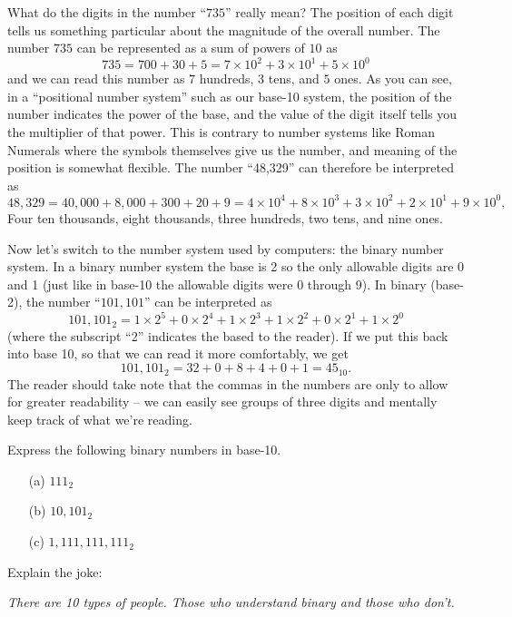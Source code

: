 What do the digits in the number ``$735$'' really mean?  The position of each digit tells
us something particular about the magnitude of the overall number.  The number $735$ can
be represented as a sum of powers of $10$ as
\[ 735 = 700 + 30 + 5 =  7 \times 10^2 + 3 \times 10^1 + 5 \times 10^0 \]
and we can read this number as $7$ hundreds, $3$ tens, and $5$ ones.
As you can see, in a ``positional number system'' such as our base-10 system, the
position of the number indicates the power of the base, and the value of the digit itself
tells you the multiplier of that power.  This is contrary to number systems like Roman
Numerals where the symbols themselves give us the number, and meaning of the position is
somewhat flexible.
The number ``48,329'' can therefore be interpreted as
\[ 48,329 = 40,000 + 8,000 + 300 + 20 + 9 = 4 \times 10^4 + 8 \times 10^3 + 3 \times 10^2 + 2
\times 10^1 + 9 \times 10^0, \]
Four ten thousands, eight thousands, three hundreds, two tens, and nine ones.

Now let's switch to the number system used by computers: the binary number system.  In a
binary number system the base is 2 so the only allowable digits are 0 and 1 (just like in
base-10 the allowable digits were 0 through 9).  In binary (base-2), the number
``$101,101$'' can be interpreted as
\[ 101,101_2 = 1 \times 2^5 + 0 \times 2^4 + 1 \times 2^3 + 1 \times 2^2 + 0 \times 2^1 + 1
\times 2^0 \]
(where the subscript ``2'' indicates the based to the reader).
If we put this back into base 10, so that we can read it more comfortably, we get
\[ 101,101_2 = 32 + 0 + 8 + 4 + 0 + 1 = 45_{10}. \] 
The reader should take note that the commas in the numbers are only to allow for greater
readability -- we can easily see groups of three digits and mentally keep track of what
we're reading.

\begin{problem}
    Express the following binary numbers in base-10.
    \begin{enumerate}
        \item[(a)] $111_2$
        \item[(b)] $10,101_2$
        \item[(c)] $1,111,111,111_2$
    \end{enumerate}
\end{problem}

\begin{problem}
    Explain the joke:
    \begin{center}
        {\it There are 10 types of people.  Those who understand binary and those who
        don't.}
    \end{center}
\end{problem}

